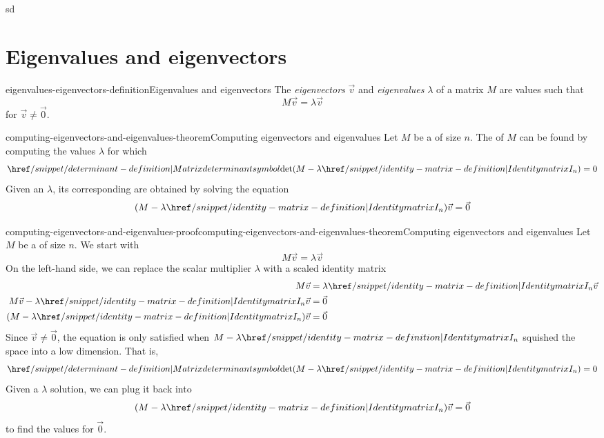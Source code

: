 \documentclass[preview]{standalone}
\begin{document}
sd
\genpage

\section{Eigenvalues and eigenvectors}

\begin{snippetdefinition}{eigenvalues-eigenvectors-definition}{Eigenvalues and eigenvectors}
    The \textit{eigenvectors} \(\vec{v}\) and \textit{eigenvalues} \(\lambda\) of a matrix \(M\)
    are values such that
    \[
        M\vec{v} = \lambda \vec{v}
    \]
    for \(\vec{v}\neq \vec{0}\).
\end{snippetdefinition}


\begin{snippettheorem}{computing-eigenvectors-and-eigenvalues-theorem}{Computing eigenvectors and eigenvalues}
    Let \(M\) be a \matrix of size \(n\).
    The \eigenvalue[eigenvalues] of \(M\) can be found by computing the values \(\lambda\) for which
    \[ \det(M-\lambda \identmatrix{n}) = 0 \]
    Given an \eigenvalue \(\lambda\), its corresponding \eigenvector[eigenvectors] are
    obtained by solving the equation
    \[ (M - \lambda \identmatrix{n})\vec{v} = \vec{0} \]
\end{snippettheorem}

\begin{snippetproof}{computing-eigenvectors-and-eigenvalues-proof}{computing-eigenvectors-and-eigenvalues-theorem}{Computing eigenvectors and eigenvalues}
    Let \(M\) be a \matrix of size \(n\).
    We start with
    \[
        M\vec{v} = \lambda \vec{v}
    \]
    On the left-hand side, we can replace the scalar multiplier \(\lambda\) with
    a scaled identity matrix
    \begin{align*}
        M\vec{v} &= \lambda \identmatrix{n} \vec{v} \\
        M\vec{v} - \lambda \identmatrix{n} \vec{v} &= \vec{0} \\
        (M - \lambda \identmatrix{n})\vec{v} &= \vec{0}
    \end{align*}
    Since \(\vec{v} \neq \vec{0}\), the equation is only satisfied
    when \(M - \lambda \identmatrix{n}\) squished the space into a low dimension. That is,
    \[ \det(M-\lambda \identmatrix{n}) = 0 \]
    Given a \(\lambda\) solution, we can plug it back into
    \[ (M - \lambda \identmatrix{n})\vec{v} = \vec{0} \] to find the values for \(\vec{0}\).
\end{snippetproof}
\end{document}
